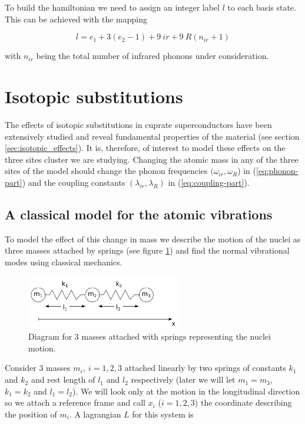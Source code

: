 To build the hamiltonian we need to assign an integer label $l$ to each basis state. 
This can be achieved with the mapping

\begin{equation}
  \label{eq:label}
  l = e_1 + 3(e_2 - 1) + 9\ ir + 9\ R (n_{ir} +1)
\end{equation}

\noindent with $n_{ir}$ being the total number of infrared phonons under consideration.

\section{Isotopic substitutions}
\label{sec:isotopic-model}

The effects of isotopic substitutions in cuprate superconductors have been extensively studied and reveal fundamental properties of the material (see section \ref{sec:isotopic_effects}). 
It is, therefore, of interest to model these effects on the three sites cluster we are studying.
Changing the atomic mass in any of the three sites of the model should change the phonon frequencies $(\omega_{ir},\omega_R$) in (\ref{eq:phonon-part}) and the coupling constants $(\lambda_{ir},\lambda_R)$ in (\ref{eq:coupling-part}).

\subsection{A classical model for the atomic vibrations}

To model the effect of this change in mass we describe the motion of the nuclei as three masses attached by springs (see figure \ref{fig:3-masses-2-springs}) and find the normal vibrational modes using classical mechanics.

\begin{figure}[ht!]
\centering
\includegraphics[width=0.6\textwidth]{images/3-masses-2-springs-linear.png}
\caption{Diagram for 3 masses attached with springs representing the nuclei motion.}
\label{fig:3-masses-2-springs}
\end{figure}

Consider 3 masses $m_i,\ i=1,2,3$ attached linearly by two springs of constants $k_1$ and $k_2$ and rest length of $l_1$ and $l_2$ respectively (later we will let $ m_1=m_3$, $ k_1=k_2$ and $l_1=l_2$). 
We will look only at the motion in the longitudinal direction so we attach a reference frame and call $ x_i$ ($i=1,2,3$) the coordinate describing the position of $m_i$.
A lagrangian $L$ for this system is 

